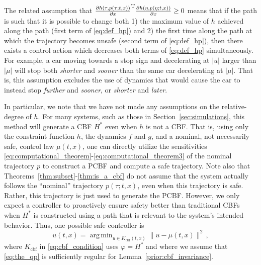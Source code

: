 \documentclass[10pt,conference]{ieeeconf}
\renewcommand{\(}{\left(}
\renewcommand{\)}{\right)}
\renewcommand{\[}{\left[}
\renewcommand{\]}{\right]}
\DeclareMathOperator*{\argmin}{arg\,min}
\newcommand{\extendedversion}[1]{{\color{black}#1}}
\begin{document}
The related assumption that $\frac{\partial h(\tau, p(\tau;t,x))}{\partial x}^\textnormal{\textrm{T}} \frac{\partial h(\eta, p(\eta;t,x))}{\partial x} \geq 0$ means that if the path is such that it is possible to change both 1) the maximum value of $h$ achieved along the path (first term of \eqref{eq:def_hp}) and 2) the first time along the path at which the trajectory becomes unsafe (second term of \eqref{eq:def_hp}), then there exists a control action which decreases both terms of \eqref{eq:def_hp} simultaneously. For example, a car moving towards a stop sign and decelerating at $|u|$ larger than $|\mu|$ will stop both \textit{shorter} and \textit{sooner} than the same car decelerating at $|\mu|$. That is, this assumption excludes the use of dynamics that would cause the car to instead stop \textit{further} and \textit{sooner}, or \textit{shorter} and \textit{later}.

In particular, we note that we have not made any assumptions on the relative-degree of $h$. For many systems, such as those in Section~\ref{sec:simulations}, this method will generate a CBF $H^*$ even when $h$ is not a CBF. \extendedversion{That is, using only the constraint function $h$, the dynamics $f$ and $g$, and a nominal, not necessarily safe, control law $\mu(t,x)$, one can directly utilize the sensitivities \eqref{eq:computational_theorem}-\eqref{eq:computational_theorem3} of the nominal trajectory $p$ to construct a PCBF and compute a safe trajectory.} Note also that Theorems~\ref{thm:subset}-\ref{thm:is_a_cbf} do not assume that the system actually follows the ``nominal'' trajectory $p(\tau;t,x)${, even when this trajectory is safe}. Rather, this trajectory is just used to generate the PCBF. However, we only expect a controller to proactively ensure safety better than traditional CBFs when $H^*$ is constructed using a path that is relevant to the system's {intended} behavior. Thus, one possible safe controller is
\begin{equation}
    u(t,x) = \argmin_{u \in K_\textrm{cbf}(t,x)} \| u -\mu(t,x) \|^2 \,, \label{eq:the_qp}
\end{equation}
where {$K_\textrm{cbf}$ in \eqref{eq:cbf_condition} uses $\varphi = H^*$ and where} we assume that \eqref{eq:the_qp} is sufficiently regular for Lemma~\ref{prior:cbf_invariance}.
\end{document}
